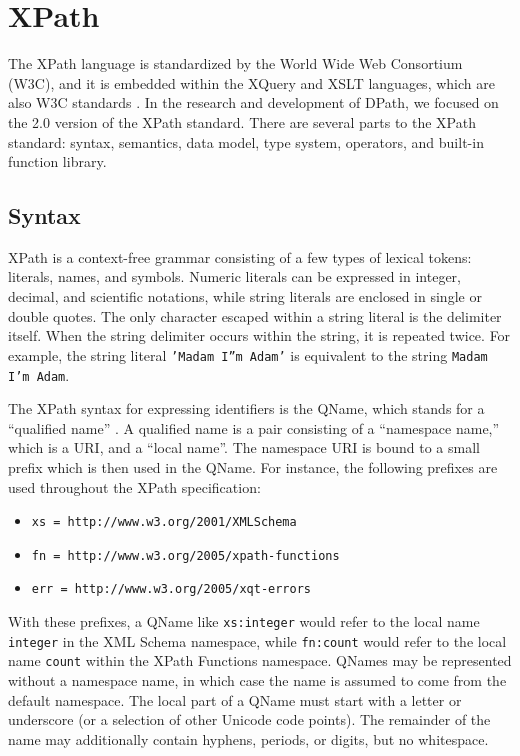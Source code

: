 \documentclass{article}
\begin{document}
\section{XPath}
\label{sec:xpath}

The XPath language is standardized by the World Wide Web Consortium (W3C), and
it is embedded within the XQuery and XSLT languages, which are also W3C
standards \cite{xpath}. In the research and development of DPath, we focused on
the 2.0 version of the XPath standard. There are several parts to the XPath
standard: syntax\cite{xpath}, semantics\cite{xpath-semantics}, data model, type
system\cite{xpath-datamodel}, operators, and built-in function
library\cite{xpath-functions}.

\subsection{Syntax}

XPath is a context-free grammar consisting of a few types of lexical tokens:
literals, names, and symbols. Numeric literals can be expressed in integer,
decimal, and scientific notations, while string literals are enclosed in single
or double quotes. The only character escaped within a string literal is the
delimiter itself. When the string delimiter occurs within the string, it is
repeated twice. For example, the string literal \texttt{'Madam I''m Adam'} is
equivalent to the string \texttt{Madam I'm Adam}.

The XPath syntax for expressing identifiers is the QName, which stands for a
``qualified name'' \cite{xml-names}. A qualified name is a pair consisting of a
``namespace name,'' which is a URI, and a ``local name''. The namespace URI is
bound to a small prefix which is then used in the QName. For instance, the
following prefixes are used throughout the XPath specification\cite{xpath}:

\begin{itemize}
\item \texttt{xs = http://www.w3.org/2001/XMLSchema}
\item \texttt{fn = http://www.w3.org/2005/xpath-functions}
\item \texttt{err = http://www.w3.org/2005/xqt-errors}
\end{itemize}

With these prefixes, a QName like \texttt{xs:integer} would refer to the local
name \texttt{integer} in the XML Schema namespace, while \texttt{fn:count} would
refer to the local name \texttt{count} within the XPath Functions namespace.
QNames may be represented without a namespace name, in which case the name is
assumed to come from the default namespace. The local part of a QName must start
with a letter or underscore (or a selection of other Unicode code points). The
remainder of the name may additionally contain hyphens, periods, or digits, but
no whitespace.
\end{document}
